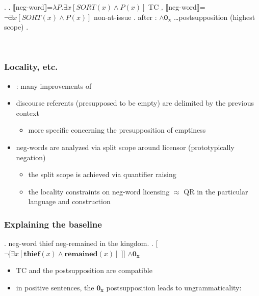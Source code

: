 \documentclass[
  letterpaper,
  DIV=11,
  numbers=noendperiod]{scrartcl}
\providecommand{\tightlist}{%
  \setlength{\itemsep}{0pt}\setlength{\parskip}{0pt}}\usepackage{longtable,booktabs,array}
\begin{document}
\ex. \a.
\(\llbracket\)neg-word\(\rrbracket\)=\(\lambda P.\exists x[SORT(x) \wedge P(x)]\)
\hfill TC \b.
\(\llbracket\)neg-word\(\rrbracket\)=\(\neg \exists x[SORT(x) \wedge P(x)]\)
\hfill non-at-issue \a. after \textcite{kuhn2022dynamics}:
\(\wedge \mathbf{0_x}\) \ldots postsupposition (highest scope) \z.

~

\hypertarget{locality-etc.}{%
\subsubsection{Locality, etc.}\label{locality-etc.}}

\begin{itemize}
\tightlist
\item
  \textcite{kuhn2022dynamics}: many improvements of
  \textcite{ovalle2004double}
\item
  discourse referents (presupposed to be empty) are delimited by the
  previous context

  \begin{itemize}
  \tightlist
  \item
    more specific concerning the presupposition of emptiness
  \end{itemize}
\item
  neg-words are analyzed via split scope around licensor (prototypically
  negation)

  \begin{itemize}
  \tightlist
  \item
    the split scope is achieved via quantifier raising
  \item
    the locality constraints on neg-word licensing \(\approx\) QR in the
    particular language and construction
  \end{itemize}
\end{itemize}

\hypertarget{explaining-the-baseline}{%
\subsubsection{Explaining the baseline}\label{explaining-the-baseline}}

\ex. neg-word thief neg-remained in the kingdom. \a.
{[}\(\neg[\exists x[\mathbf{thief}(x) \wedge \mathbf{remained}(x)]\)
{]}{]} \(\wedge \mathbf{0_x}\)

\begin{itemize}
\tightlist
\item
  TC and the postsupposition are compatible
\item
  in positive sentences, the \(\mathbf{0_x}\) postsupposition leads to
  ungrammaticality:
\end{itemize}
\end{document}
